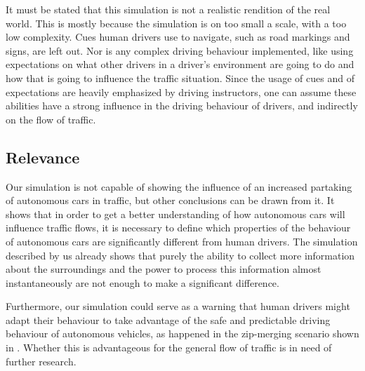 It must be stated that this simulation is not a realistic rendition of the real world. This is mostly because the simulation is on too small a scale, with a too low complexity. Cues human drivers use to navigate, such as road markings and signs, are left out. Nor is any complex driving behaviour implemented, like using expectations on what other drivers in a driver's environment are going to do and how that is going to influence the traffic situation. Since the usage of cues and of expectations are heavily emphasized by driving instructors, one can assume these abilities have a strong influence in the driving behaviour of drivers, and indirectly on the flow of traffic.

\subsection{Relevance}
\label{sub:conclusion:relevance}
Our simulation is not capable of showing the influence of an increased partaking of autonomous cars in traffic, but other conclusions can be drawn from it. It shows that in order to get a better understanding of how autonomous cars will influence traffic flows, it is necessary to define which properties of the behaviour of autonomous cars are significantly different from human drivers. The simulation described by us already shows that purely the ability to collect more information about the surroundings and the power to process this information almost instantaneously are not enough to make a significant difference.

Furthermore, our simulation could serve as a warning that human drivers might adapt their behaviour to take advantage of the safe and predictable driving behaviour of autonomous vehicles, as happened in the zip-merging scenario shown in . Whether this is advantageous for the general flow of traffic is in need of further research.